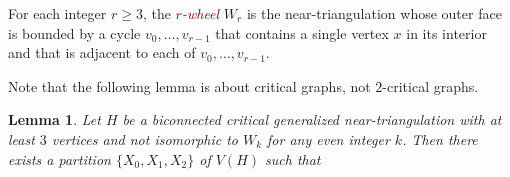 \documentclass[12pt]{article}
\newtheorem{lem}{Lemma}
\DeclareMathOperator{\corners}{\Gamma}
\newcommand{\defin}[1]{\emph{\textcolor{Maroon}{#1}}}
\theoremstyle{definition}
\begin{document}
%
%
%
%

For each integer $r\ge 3$, the \defin{$r$-wheel} $W_r$ is the near-triangulation whose outer face is bounded by a cycle $v_0,\ldots,v_{r-1}$ that contains a single vertex $x$ in its interior and that is adjacent to each of $v_0,\ldots,v_{r-1}$.

Note that the following lemma is about critical graphs, not $2$-critical graphs.

\begin{lem}\label{biconnected_critical}
  Let $H$ be a biconnected critical generalized near-triangulation with at least $3$ vertices and not isomorphic to $W_k$ for any even integer $k$.  Then there exists a partition $\{X_0,X_1,X_2\}$ of $V(H)$ such that
\end{lem}
\end{document}
